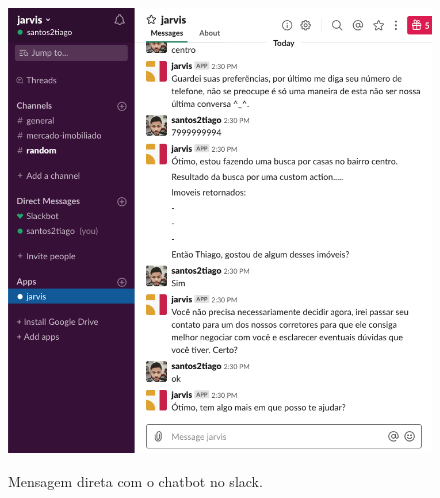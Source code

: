 \begin{figure}[H]
  \centering
   \caption{Mensagem direta com o chatbot no slack.}
  \includegraphics[scale=0.5]{Imagens/slack02.png} 
  \label{slack02}
\end{figure}



